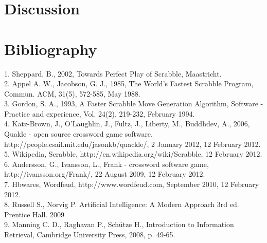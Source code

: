 \documentclass[a4paper, 12pt]{report}
\begin{document}
\chapter{Discussion}
\chapter{Bibliography}
1. Sheppard, B., 2002, Towards Perfect Play of Scrabble, Maastricht.\\
2. Appel A. W., Jacobson, G. J., 1985, The World’s Fastest Scrabble Program, Commun. ACM, 31(5), 572-585, May 1988.\\
3. Gordon, S. A., 1993, A Faster Scrabble Move Generation Algorithm, Software - Practice and experience, Vol. 24(2), 219-232, February 1994.\\
4.  Katz-Brown, J., O’Laughlin, J., Fultz, J., Liberty, M., Buddhdev, A., 2006, Quakle - open source crossword game software, \\ http://people.csail.mit.edu/jasonkb/quackle/, 2 January 2012,  12 February 2012.\\
5. Wikipedia, Scrabble, http://en.wikipedia.org/wiki/Scrabble, 12 February 2012.\\
6. Andersson, G., Ivansson, L., Frank - crossword software game, \\ http://ivansson.org/Frank/, 22 August 2009, 12 February 2012.\\
7. Hbwares, Wordfeud, http://www.wordfeud.com, September 2010, 12 February 2012.\\
8. Russell S., Norvig P. Artificial Intelligence: A Modern Approach 3rd ed. Prentice Hall. 2009\\
9. Manning C. D., Raghavan P., Schütze H., Introduction to Information Retrieval, Cambridge University Press, 2008, p. 49-65.\\
\end{document}
